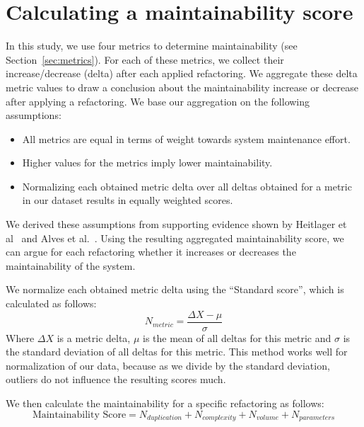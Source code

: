 \section{Calculating a maintainability score}\label{sec:metricformula}
In this study, we use four metrics to determine maintainability (see Section~\ref{sec:metrics}). For each of these metrics, we collect their increase/decrease (delta) after each applied refactoring. We aggregate these delta metric values to draw a conclusion about the maintainability increase or decrease after applying a refactoring. We base our aggregation on the following assumptions:
\begin{itemize}
  \item All metrics are equal in terms of weight towards system maintenance effort.
  \item Higher values for the metrics imply lower maintainability.
  \item Normalizing each obtained metric delta over all deltas obtained for a metric in our dataset results in equally weighted scores.
\end{itemize}
We derived these assumptions from supporting evidence shown by Heitlager et al~\cite{heitlager2007practical} and Alves et al.~\cite{alves2010deriving}. Using the resulting aggregated maintainability score, we can argue for each refactoring whether it increases or decreases the maintainability of the system.

We normalize each obtained metric delta using the ``Standard score'', which is calculated as follows:
\begin{equation}\label{eq:scoredev}
N_{metric} = \frac {\Delta X-\mu}{\sigma}
\end{equation}
Where $\Delta X$ is a metric delta, $\mu$ is the mean of all deltas for this metric and $\sigma$ is the standard deviation of all deltas for this metric. This method works well for normalization of our data, because as we divide by the standard deviation, outliers do not influence the resulting scores much.

We then calculate the maintainability for a specific refactoring as follows:
\begin{equation}\label{eq:scoreref}
\text{Maintainability Score} = N_{duplication} + N_{complexity} + N_{volume} + N_{parameters}
\end{equation}
